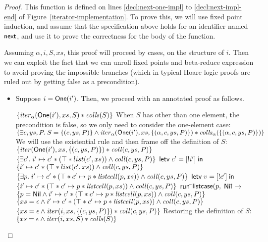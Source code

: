 \begin{proof}
This function is defined on lines \ref{decl:next-one-impl} to \ref{decl:next-impl-end} 
of Figure~\ref{iterator-implementation}. To prove this, we will use fixed point induction,
and assume that the specification above holds for an identifier named $\mathsf{next}$, and
use it to prove the correctness for the body of the function. 

Assuming $\alpha, i, S, xs$, this proof will proceed by cases, on
the structure of $i$. Then we can exploit the fact that we can unroll fixed
points and beta-reduce expression to avoid proving the impossible branches (which
in typical Hoare logic proofs are ruled out by getting false as a precondition). 

\begin{itemize}
\item Suppose $i = \mathsf{One}(i')$. Then, we proceed with an annotated proof as 
follows.  
\begin{specification}
\nextline $\{{\mathit{iter}_\alpha(\mathsf{One}(i'), xs, S) * \mathit{colls}(S)}\}$ 
\nextline When $S$ has other than one element, the precondition is false, so we only need to \nextline
          consider the one-element case:
\nextline $\{{\exists c, ys, P.\; S = \{{(c, ys, P)}\} \land \mathit{iter}_\alpha(\mathsf{One}(i'), xs, \{{(\alpha, c, ys, P)}\}) * \mathit{colls}_\alpha(\{{(\alpha, c, ys, P)}\})}\}$ 
\nextline We will use the existential rule and then frame off the definition of $S$:
\nextline $\{{\mathit{iter}(\mathsf{One}(i'), xs, \{{(c, ys, P)}\}) * \mathit{coll}(c, ys, P)}\}$ 
\nextline $\{{\exists c'.\; i' \mapsto c' * (\top * list(c', xs)) \land \mathit{coll}(c, ys, P)}\}$
\nextline $\mathsf{letv}\;c' = [!i']\;\mathsf{in}\;$ 
\nextline $\{{i' \mapsto c' * (\top * list(c', xs)) \land \mathit{coll}(c, ys, P)}\}$
\nextline $\{{\exists p.\; i' \mapsto c' * (\top * c' \mapsto p * \mathit{listcell}(p, xs)) \land \mathit{coll}(c, ys, P)}\}$
\nextline $\mathsf{letv}\;v = [!c']\;\mathsf{in}\;$ 
\nextline $\{{i' \mapsto c' * (\top * c' \mapsto p * \mathit{listcell}(p, xs)) \land \mathit{coll}(c, ys, P)}\}$
\nextline $\mathsf{run}\;$\=$\mathsf{listcase}(p,$ 
\nextline \> $\mathsf{Nil} $\=$\to$ 
\nextline \> \> $\{{p = \mathsf{Nil} \land i' \mapsto c' * (\top * c' \mapsto p * \mathit{listcell}(p, xs)) \land \mathit{coll}(c, ys, P)}\}$
\nextline \> \> $\{{xs = \epsilon \land i' \mapsto c' * (\top * c' \mapsto p * \mathit{listcell}(p, xs)) \land \mathit{coll}(c, ys, P)}\}$
\nextline \> \> $\{{xs = \epsilon \land \mathit{iter}(i, xs, \{{(c, ys, P)}\}) * \mathit{coll}(c, ys, P)}\}$
\nextline \> \> Restoring the definition of $S$:
\nextline \> \> $\{{xs = \epsilon \land \mathit{iter}(i, xs, S) * \mathit{colls}(S)}\}$

\end{specification}
\end{itemize}
\end{proof}
